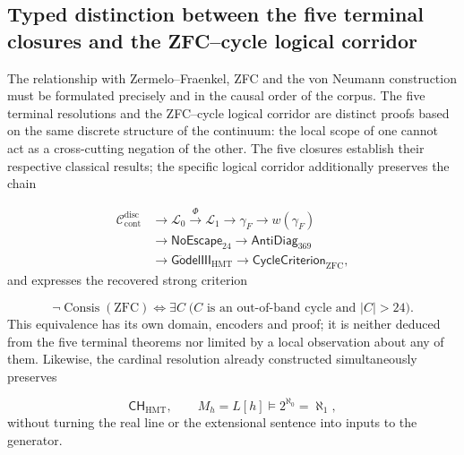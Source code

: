 \subsection{Typed distinction between the five terminal closures and the ZFC--cycle logical corridor}
The relationship with Zermelo--Fraenkel, ZFC and the von Neumann construction must be formulated precisely and in the causal order of the corpus. The five terminal resolutions and the ZFC--cycle logical corridor are distinct proofs based on the same discrete structure of the continuum: the local scope of one cannot act as a cross-cutting negation of the other. The five closures establish their respective classical results; the specific logical corridor additionally preserves the chain\par
\[
\begin{aligned}
 \mathcal C_{\mathrm{cont}}^{\mathrm{disc}}
 &\longrightarrow\mathcal L_0\xrightarrow{\Phi}\mathcal L_1
 \longrightarrow\gamma_F\longrightarrow w(\gamma_F)\\
 &\longrightarrow\mathsf{NoEscape}_{24}
 \longrightarrow\mathsf{AntiDiag}_{369}\\
 &\longrightarrow\mathsf{G\ddot{o}delIII}_{\mathrm{HMT}}
 \longrightarrow\mathsf{CycleCriterion}_{\mathrm{ZFC}},
\end{aligned}
\]
and expresses the recovered strong criterion\par
\[
 \boxed{
 \neg\operatorname{Consis}(\mathrm{ZFC})
 \Longleftrightarrow
 \exists C\;\bigl(C\text{ is an out-of-band cycle and }|C|>24\bigr).}
\]
This equivalence has its own domain, encoders and proof; it is neither deduced from the five terminal theorems nor limited by a local observation about any of them. Likewise, the cardinal resolution already constructed simultaneously preserves\par
\[
 \mathsf{CH}_{\mathrm{HMT}},
 \qquad
 M_h=L[h]\models 2^{\aleph_0}=\aleph_1,
\]
without turning the real line or the extensional sentence into inputs to the generator.\par

